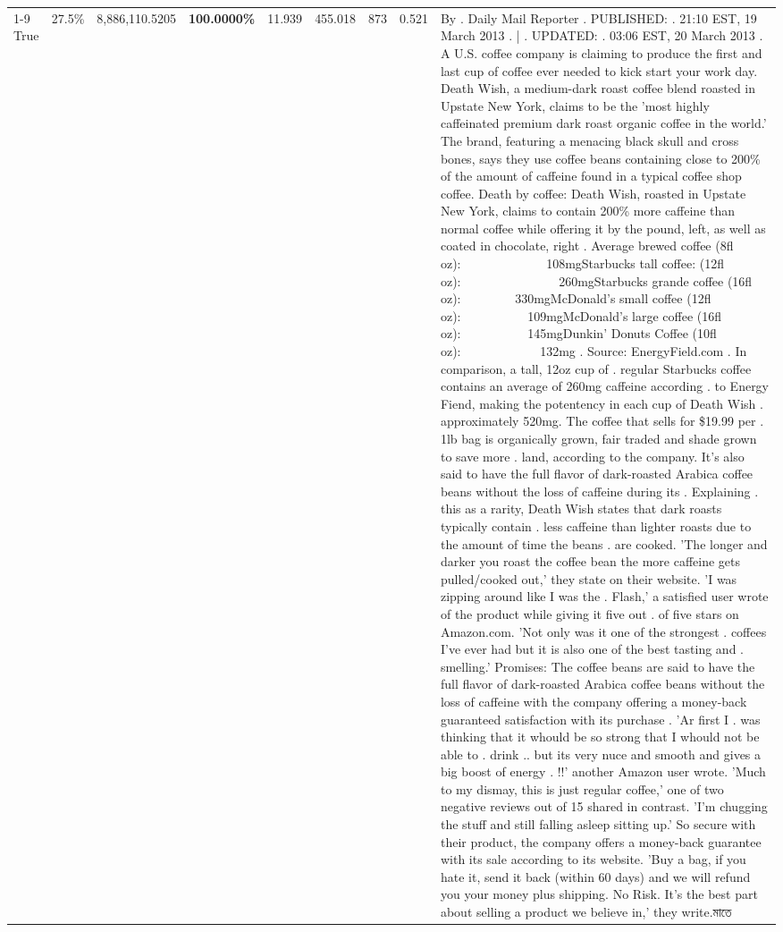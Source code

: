 \begin{table}[H]
{\begin{tabular}{lllrlllll}
\cline{1-9}
True & 27.5\% & 8,886,110.5205 & \bfseries \color{red} 100.0000\% & 11.939 & 455.018 & 873 & 0.521 & By . Daily Mail Reporter . PUBLISHED: . 21:10 EST, 19 March 2013 . | . UPDATED: . 03:06 EST, 20 March 2013 . A U.S. coffee company is claiming to produce the first and last cup of coffee ever needed to kick start your work day. Death Wish, a medium-dark roast coffee blend roasted in Upstate New York, claims to be the 'most highly caffeinated premium dark roast organic coffee in the world.' The brand, featuring a menacing black skull and cross bones, says they use coffee beans containing close to 200\% of the amount of caffeine found in a typical coffee shop coffee. Death by coffee: Death Wish, roasted in Upstate New York, claims to contain 200\% more caffeine than normal coffee while offering it by the pound, left, as well as coated in chocolate, right . Average brewed coffee (8fl oz):              108mgStarbucks tall coffee: (12fl oz):                260mgStarbucks grande coffee (16fl oz):         330mgMcDonald's small coffee (12fl oz):           109mgMcDonald's large coffee (16fl oz):           145mgDunkin' Donuts Coffee (10fl oz):             132mg . Source: EnergyField.com . In comparison, a tall, 12oz cup of . regular Starbucks coffee contains an average of 260mg caffeine according . to Energy Fiend, making the potentency in each cup of Death Wish . approximately 520mg. The coffee that sells for \$19.99 per . 1lb bag is organically grown, fair traded and shade grown to save more . land, according to the company. It's also said to have the full flavor of dark-roasted Arabica coffee beans without the loss of caffeine during its . Explaining . this as a rarity, Death Wish states that dark roasts typically contain . less caffeine than lighter roasts due to the amount of time the beans . are cooked. 'The longer and darker you roast the coffee bean the more caffeine gets pulled/cooked out,' they state on their website. 'I was zipping around like I was the . Flash,' a satisfied user wrote of the product while giving it five out . of five stars on Amazon.com. 'Not only was it one of the strongest . coffees I've ever had but it is also one of the best tasting and . smelling.’ Promises: The coffee beans are said to have the full flavor of dark-roasted Arabica coffee beans without the loss of caffeine with the company offering a money-back guaranteed satisfaction with its purchase . 'Ar first I . was thinking that it whould be so strong that I whould not be able to . drink .. but its very nuce and smooth and gives a big boost of energy . !!' another Amazon user wrote. 'Much to my dismay, this is just regular coffee,' one of two negative reviews out of 15 shared in contrast. 'I'm chugging the stuff and still falling asleep sitting up.' So secure with their product, the company offers a money-back guarantee with its sale according to its website. 'Buy a bag, if you hate it, send it back (within 60 days) and we will refund you your money plus shipping. No Risk. It’s the best part about selling a product we believe in,' they write.মাতে \\

\end{tabular}}
\end{table}
